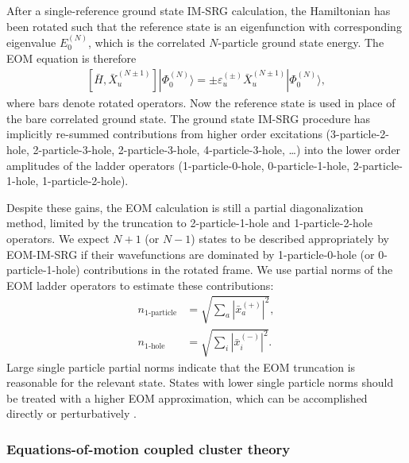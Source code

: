 \documentclass[aip, jcp, 12pt]{revtex4-1}
\newcommand{\ket}[1]{| #1 \rangle}
\begin{document}
After a single-reference ground state IM-SRG calculation, the Hamiltonian has been rotated such that the reference state is an eigenfunction with corresponding eigenvalue $E^{(N)}_0$, which is the correlated $N$-particle ground state energy. The EOM equation is therefore
\begin{align} \label{eq:EOMIMSRG}
  [\bar{H},\bar{X}^{(N \pm 1)}_u] \ket{\Phi^{(N)}_0} = \pm \varepsilon^{(\pm)}_u \bar{X}^{(N \pm 1)}_u \ket{\Phi^{(N)}_0},
\end{align}
where bars denote rotated operators. Now the reference state is used in place of the bare correlated ground state. The ground state IM-SRG procedure has implicitly re-summed contributions from higher order excitations (3-particle-2-hole, 2-particle-3-hole, 2-particle-3-hole, 4-particle-3-hole, \ldots) into the lower order amplitudes of the ladder operators (1-particle-0-hole, 0-particle-1-hole, 2-particle-1-hole, 1-particle-2-hole).

Despite these gains, the EOM calculation is still a partial diagonalization method, limited by the truncation to 2-particle-1-hole and 1-particle-2-hole operators. We expect $N + 1$ (or $N - 1$) states to be described appropriately by EOM-IM-SRG if their wavefunctions are dominated by 1-particle-0-hole (or 0-particle-1-hole) contributions in the rotated frame. We use partial norms of the EOM ladder operators to estimate these contributions:
\begin{align}
  \label{eq:partial_norms_p}
  n_{\text{1-particle}} &= \sqrt{\sum_a | \bar{x}^{(+)}_a |^2},\\
  \label{eq:partial_norms_h}
  n_{\text{1-hole}} &= \sqrt{\sum_i | \bar{x}^{(-)}_i |^2}.
\end{align}
Large single particle partial norms indicate that the EOM truncation is reasonable for the relevant state. States with lower single particle norms should be treated with a higher EOM approximation, which can be accomplished directly or perturbatively \cite{PhysRevC.95.044304}.

\subsubsection*{Equations-of-motion coupled cluster theory}
\end{document}
